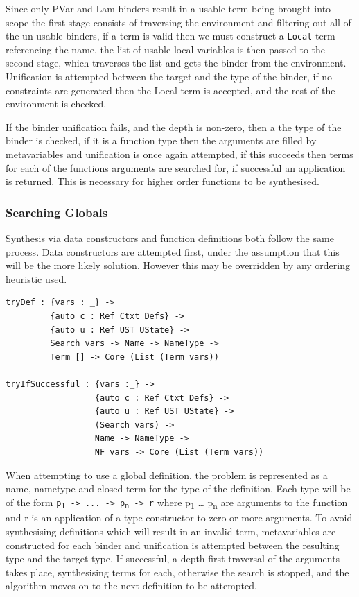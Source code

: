 \documentclass[a4paper]{article}
\begin{document}
Since only PVar and Lam binders result in a usable term being brought into scope the first stage consists of traversing
the environment and filtering out all of the un-usable binders, if a term is valid then we must construct a \texttt{Local} 
term referencing the name, the list of usable local variables is then passed to the second stage, which traverses the 
list and gets the binder from the environment. Unification is attempted between the target and the type of the binder,
if no constraints are generated then the Local term is accepted, and the rest of the environment is checked. 

If the binder unification fails, and the depth is non-zero, then a the type of the binder is checked, if it is a 
function type then the arguments are filled by metavariables and unification is once again attempted, if this 
succeeds then terms for each of the functions arguments are searched for, if successful an application is returned. This
is necessary for higher order functions to be synthesised.   

\subsubsection{Searching Globals}
\label{sec:org8039f5d}

Synthesis via data constructors and function definitions
both follow the same process. Data constructors are attempted
first, under the assumption that this will be the more likely solution.
However this may be overridden by any ordering heuristic used.

\begin{center}
\begin{verbatim}
tryDef : {vars : _} ->
		 {auto c : Ref Ctxt Defs} -> 
		 {auto u : Ref UST UState} ->
		 Search vars -> Name -> NameType ->
		 Term [] -> Core (List (Term vars))

tryIfSuccessful : {vars :_} ->
				  {auto c : Ref Ctxt Defs} ->
				  {auto u : Ref UST UState} ->
				  (Search vars) ->
				  Name -> NameType ->
				  NF vars -> Core (List (Term vars))
\end{verbatim}
\end{center}

When attempting to use a global definition, the problem is represented as a
name, nametype and closed term for the type of the definition. 
Each type will be of the form \texttt{p\textsubscript{1} -> ... -> p\textsubscript{n} -> r} where p\textsubscript{1} \ldots{} p\textsubscript{n} are 
arguments to the function and r is an application of a type constructor
to zero or more arguments. To avoid synthesising definitions which 
will result in an invalid term, metavariables are constructed for each binder and 
unification is attempted between the resulting type and the target type. If 
successful, a depth first traversal of the arguments takes place, synthesising terms for 
each, otherwise the search is stopped, and the algorithm
moves on to the next definition to be attempted. 
\end{document}
